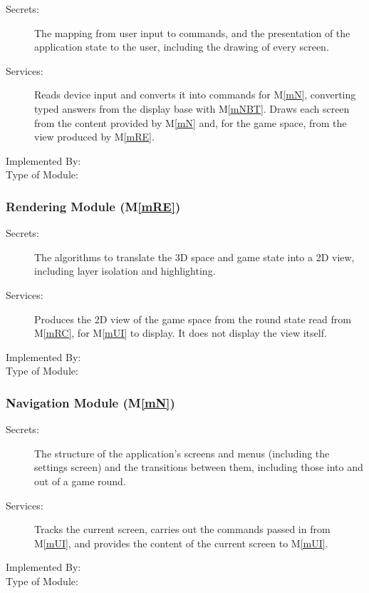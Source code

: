 \documentclass[12pt, titlepage]{article}
\newcommand{\mref}[1]{M\ref{#1}}
\begin{document}
\begin{description}
\item[Secrets:] The mapping from user input to commands, and the presentation of the application state to the user, including the drawing of every screen.
\item[Services:] Reads device input and converts it into commands for \mref{mN}, converting typed answers from the display base with \mref{mNBT}. Draws each screen from the content provided by \mref{mN} and, for the game space, from the view produced by \mref{mRE}.
\item[Implemented By:]
\item[Type of Module:]
\end{description}

\subsubsection{Rendering Module (\mref{mRE})}

\begin{description}
\item[Secrets:] The algorithms to translate the 3D space and game state into a 2D view, including layer isolation and highlighting.
\item[Services:] Produces the 2D view of the game space from the round state read from \mref{mRC}, for \mref{mUI} to display. It does not display the view itself.
\item[Implemented By:]
\item[Type of Module:]
\end{description}

\subsubsection{Navigation Module (\mref{mN})}

\begin{description}
\item[Secrets:] The structure of the application's screens and menus (including the settings screen) and the transitions between them, including those into and out of a game round.
\item[Services:] Tracks the current screen, carries out the commands passed in from \mref{mUI}, and provides the content of the current screen to \mref{mUI}.
\item[Implemented By:]
\item[Type of Module:]
\end{description}
\end{document}
